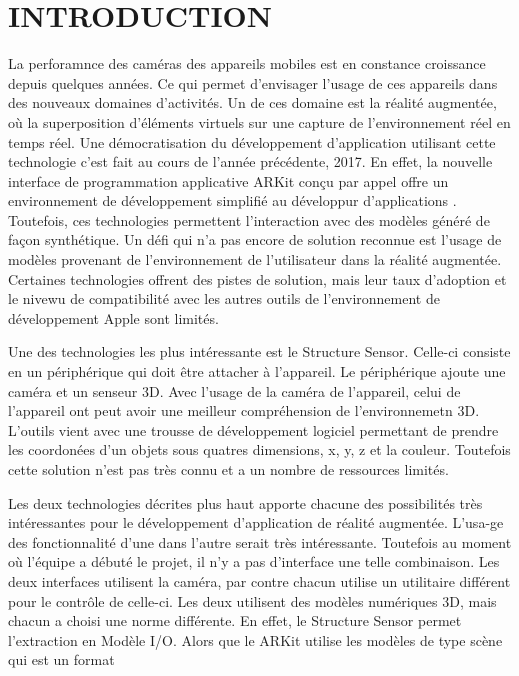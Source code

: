 \documentclass[letterpaper,twoside,12pt,french]{report}
\begin{document}
\chapter*{\uppercase{Introduction}}
La perforamnce des caméras des appareils mobiles est en constance croissance depuis quelques
années. Ce qui permet d'envisager l'usage de ces appareils dans des nouveaux domaines d'activités.
Un de ces domaine est la réalité augmentée, où la superposition d'éléments virtuels sur une
capture de l'environnement réel en temps réel. Une démocratisation du développement d'application
utilisant cette technologie c'est fait au cours de l'année précédente, 2017. En effet, la nouvelle
interface de programmation applicative ARKit conçu par appel offre un environnement de
développement simplifié au développur d'applications \citep*{StattN2017}. Toutefois, ces technologies
permettent l'interaction avec des modèles généré de façon synthétique. Un défi qui n'a pas encore
de solution reconnue est l'usage de modèles provenant de l'environnement de l'utilisateur dans la
réalité augmentée. Certaines technologies offrent des pistes de solution, mais leur taux d'adoption
et le nivewu de compatibilité avec les autres outils de l'environnement de développement Apple sont
limités.
\par
Une des technologies les plus intéressante est le Structure Sensor\citep*{molitchHou01}. Celle-ci
consiste en un périphérique qui doit être attacher à l'appareil. Le périphérique ajoute une caméra
et un senseur 3D. Avec l'usage de la caméra de l'appareil, celui de l'appareil ont peut avoir une
meilleur compréhension de l'environnemetn 3D. L'outils vient avec une trousse de développement
logiciel permettant de prendre les coordonées d'un objets sous quatres dimensions, x, y, z et la
couleur. Toutefois cette solution n'est pas très connu et a un nombre de ressources limités.
\par
Les deux technologies décrites plus haut apporte chacune des possibilités très intéressantes pour
le développement d'application de réalité augmentée. L'usa\hyp{}ge des fonctionnalité d'une dans l'autre
serait très intéressante. Toutefois au moment où l'équipe a débuté le projet, il n'y a pas
d'interface une telle combinaison. Les deux interfaces utilisent la caméra, par contre chacun
utilise un utilitaire différent pour le contrôle de celle-ci. Les deux utilisent des modèles
numériques 3D, mais chacun a choisi une norme différente. En effet, le Structure Sensor permet
l'extraction en Modèle I/O. Alors que le ARKit utilise les modèles de type scène qui est un format
\end{document}

